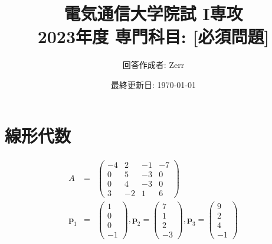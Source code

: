 \documentclass[11pt, titlepage]{jsarticle}
\title{電気通信大学院試 I専攻\\2023年度 専門科目: [必須問題]}
\author{回答作成者: Zerr}
\date{最終更新日: \today}
\begin{document}
\cfoot{\thepage}

\maketitle
\section{線形代数}
\begin{eqnarray*}
  A&=&\begin{pmatrix}
    -4 & 2  & -1 & -7 \\
    0  & 5  & -3 & 0  \\
    0  & 4  & -3 & 0  \\
    3  & -2 & 1  & 6
  \end{pmatrix}\\
  \boldsymbol p_1&=&\begin{pmatrix}
    1 \\
    0 \\
    0 \\
    -1
  \end{pmatrix}
  ,\boldsymbol p_2=\begin{pmatrix}
    7 \\
    1 \\
    2 \\
    -3
  \end{pmatrix}
  ,\boldsymbol p_3=\begin{pmatrix}
    9 \\
    2 \\
    4 \\
    -1
  \end{pmatrix}
\end{eqnarray*}
\end{document}
